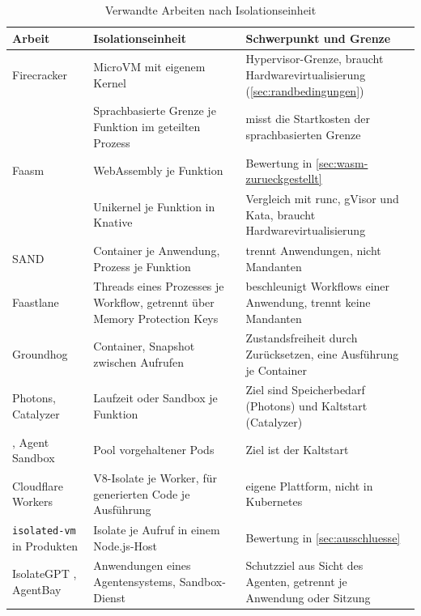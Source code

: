 \begin{table}[H]
  \caption{Verwandte Arbeiten nach Isolationseinheit}
  \label{tab:verwandt}
  \footnotesize
  \begin{tabularx}{\textwidth}{@{}>{\RaggedRight\arraybackslash}p{} >{\RaggedRight\arraybackslash}p{} >{\RaggedRight\arraybackslash}X@{}}
    \hline
    Arbeit & Isolationseinheit & Schwerpunkt und Grenze \\
    \hline
    Firecracker \autocite[S.~419, 422]{agache_firecracker_2020} & MicroVM mit eigenem Kernel & Hypervisor-Grenze, braucht
      Hardwarevirtualisierung (\autoref{sec:randbedingungen}) \\
    \textcite[S.~645]{boucher_putting_2018} & Sprachbasierte Grenze je Funktion im geteilten Prozess & misst die Startkosten der
      sprachbasierten Grenze \\
    Faasm \autocite[S.~419]{shillaker_faasm_2020} & WebAssembly je Funktion &
      Bewertung in
      \autoref{sec:wasm-zurueckgestellt} \\
    \textcite[S.~25--26]{mainas_sandboxing_2024} & Unikernel je Funktion in Knative & Vergleich mit runc, gVisor und Kata, braucht Hardwarevirtualisierung \\
    SAND \autocite[S.~924]{akkus_sand_2018} & Container je Anwendung, Prozess je Funktion & trennt Anwendungen, nicht
      Mandanten \\
    Faastlane \autocite[S.~957]{kotni_faastlane_2021} & Threads eines Prozesses je Workflow, getrennt über Memory
      Protection Keys & beschleunigt Workflows einer Anwendung, trennt keine Mandanten \\
    Groundhog \autocite[S.~398]{alzayat_groundhog_2023} & Container, Snapshot zwischen Aufrufen & Zustandsfreiheit durch
      Zurücksetzen, eine Ausführung je Container \\
    Photons, Catalyzer \autocites[S.~45]{dukic_photons_2020}[S.~467]{du_catalyzer_2020} & Laufzeit oder Sandbox je Funktion & Ziel sind Speicherbedarf (Photons) und Kaltstart (Catalyzer) \\
    \textcite[S.~1]{lin_mitigating_2019}, Agent Sandbox \autocite{kuo_running_2026} & Pool vorgehaltener Pods &
      Ziel ist der Kaltstart \\
    Cloudflare Workers \autocites{cloudflare_security_2026}{cloudflare_worker_2026} & V8-Isolate je Worker, für
      generierten Code je Ausführung & eigene Plattform, nicht in
      Kubernetes \\
    \texttt{isolated-vm} in Produkten \autocites{activepieces_sandboxing_2026}{tanstack_code_2026} & Isolate je
      Aufruf in einem Node.js-Host & Bewertung in
      \autoref{sec:ausschluesse} \\
    IsolateGPT \autocite[S.~1]{wu_isolategpt_2025}, AgentBay \autocite[S.~1]{piao_agentbay_2025} & Anwendungen eines
      Agentensystems, Sandbox-Dienst & Schutzziel aus Sicht des Agenten, getrennt je Anwendung oder Sitzung \\
    \hline
  \end{tabularx}
\end{table}
